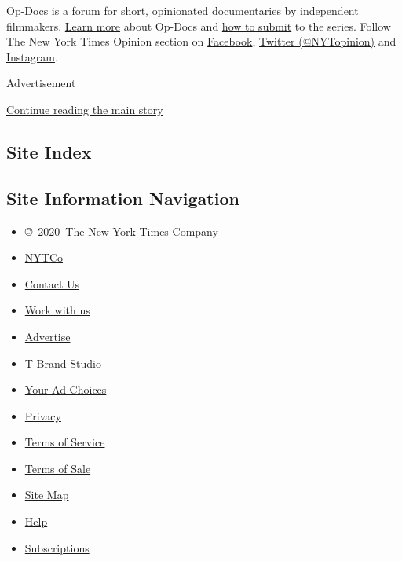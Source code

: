 \href{https://www.nytimes.com/column/op-docs}{Op-Docs} is a forum for
short, opinionated documentaries by independent filmmakers.
\href{http://www.nytimes.com/ref/opinion/about-op-docs.html}{Learn more}
about Op-Docs and
\href{http://www.nytimes.com/content/help/site/editorial/op-video/video.html?ref=opinion}{how
to submit} to the series. Follow The New York Times Opinion section on
\href{https://www.facebook.com/nytopinion}{Facebook},
\href{http://twitter.com/NYTOpinion}{Twitter (@NYTopinion)} and
\href{https://www.instagram.com/nytopinion/}{Instagram}.

Advertisement

\protect\hyperlink{after-bottom}{Continue reading the main story}

\hypertarget{site-index}{%
\subsection{Site Index}\label{site-index}}

\hypertarget{site-information-navigation}{%
\subsection{Site Information
Navigation}\label{site-information-navigation}}

\begin{itemize}
\tightlist
\item
  \href{https://help.nytimes.com/hc/en-us/articles/115014792127-Copyright-notice}{©~2020~The
  New York Times Company}
\end{itemize}

\begin{itemize}
\tightlist
\item
  \href{https://www.nytco.com/}{NYTCo}
\item
  \href{https://help.nytimes.com/hc/en-us/articles/115015385887-Contact-Us}{Contact
  Us}
\item
  \href{https://www.nytco.com/careers/}{Work with us}
\item
  \href{https://nytmediakit.com/}{Advertise}
\item
  \href{http://www.tbrandstudio.com/}{T Brand Studio}
\item
  \href{https://www.nytimes.com/privacy/cookie-policy\#how-do-i-manage-trackers}{Your
  Ad Choices}
\item
  \href{https://www.nytimes.com/privacy}{Privacy}
\item
  \href{https://help.nytimes.com/hc/en-us/articles/115014893428-Terms-of-service}{Terms
  of Service}
\item
  \href{https://help.nytimes.com/hc/en-us/articles/115014893968-Terms-of-sale}{Terms
  of Sale}
\item
  \href{https://spiderbites.nytimes.com}{Site Map}
\item
  \href{https://help.nytimes.com/hc/en-us}{Help}
\item
  \href{https://www.nytimes.com/subscription?campaignId=37WXW}{Subscriptions}
\end{itemize}

